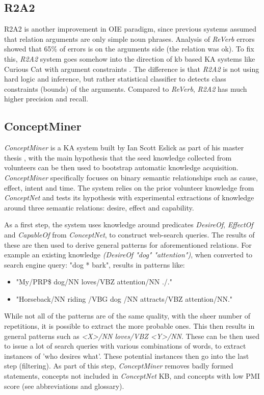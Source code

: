\subsection{R2A2}
\label{section:r:r2a2}
R2A2 is another improvement in OIE paradigm, since previous systems assumed that
relation arguments are only simple noun phrases. Analysis of \emph{ReVerb}
errors showed that 65\% of errors is on the arguments side (the relation was ok).
To fix this, \emph{R2A2} system goes somehow into the direction of kb based
KA systems like Curious Cat with argument constraints \parencite{Etzioni2011}. 
The difference is that 
\emph{R2A2} is not using hard logic and inference, but rather statistical
classifier to detects class constraints (bounds) of the arguments. Compared to
\emph{ReVerb}, \emph{R2A2} has much higher precision and recall.

\subsection{ConceptMiner}
\label{section:r:conceptminer}
\emph{ConceptMiner} is a KA system built by Ian Scott Eslick as part of his
master thesis \parencite{Eslick2006}, with the main hypothesis that the seed
knowledge collected from volunteers can be then used to bootstrap automatic 
knowledge acquisition. \emph{ConceptMiner} specifically focuses on binary
semantic relationships such as cause, effect, intent and time. The system relies
on the prior volunteer knowledge from \emph{ConceptNet} and tests its 
hypothesis with experimental extractions of knowledge around three semantic
relations: desire, effect and capability.

As a first step, the system uses knowledge around predicates \emph{DesireOf},
\emph{EffectOf} and \emph{CapableOf} from \emph{ConceptNet}, to construct 
web-search queries. The results of these are then used to derive general
patterns for aforementioned relations. For example an existing knowledge
\emph{(DesireOf "dog" "attention")}, when converted to search engine query:
"dog * bark", results in  patterns like:
\begin{itemize}
	\item "My/PRP\$ dog/NN loves/VBZ attention/NN ./."
	\item "Horseback/NN riding /VBG dog /NN attracts/VBZ attention/NN."
\end{itemize}

While not all of the patterns are of the same quality, with the sheer number of
repetitions, it is possible to extract the more probable ones. This then results
in general patterns such as \emph{<X>/NN loves/VBZ <Y>/NN}. These can be then
used to issue a lot of search queries with various combinations of words, to 
extract instances of 'who desires what'. These potential instances then go
into the last step (filtering). As part of this step, \emph{ConceptMiner} 
removes badly formed statements, concepts not included in \emph{ConceptNet} KB,
and concepts with low PMI score (see abbreviations and glossary).

